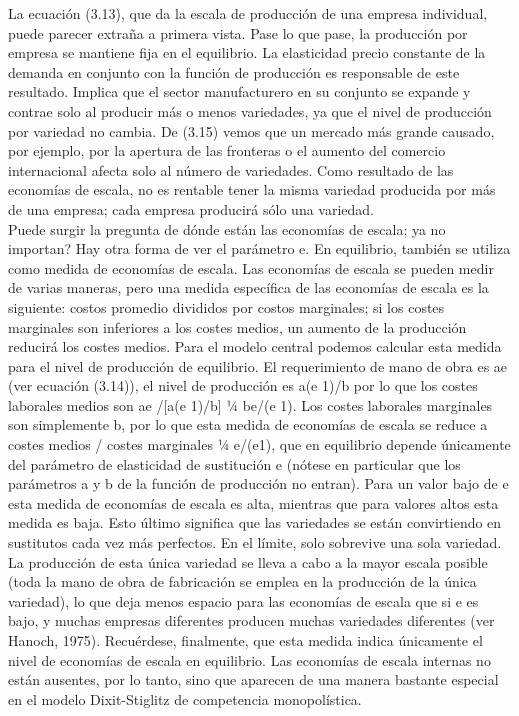 La ecuación (3.13), que da la escala de producción de una empresa individual, puede parecer extraña a primera vista. Pase lo que pase, la producción por empresa se mantiene fija en el equilibrio. La elasticidad precio constante de la demanda en conjunto con la función de producción es responsable de este resultado. Implica que el sector manufacturero en su conjunto se expande y contrae solo al producir más o menos variedades, ya que el nivel de producción por variedad no cambia. De (3.15) vemos que un mercado más grande causado, por ejemplo, por la apertura de las fronteras o el aumento del comercio internacional afecta solo al número de variedades. Como resultado de las economías de escala, no es rentable tener la misma variedad producida por más de una empresa; cada empresa producirá sólo una variedad.\\
Puede surgir la pregunta de dónde están las economías de escala; ya no importan? Hay otra forma de ver el parámetro e. En equilibrio, también se utiliza como medida de economías de escala. Las economías de escala se pueden medir de varias maneras, pero una medida específica de las economías de escala es la siguiente: costos promedio divididos por costos marginales; si los costes marginales son inferiores a los costes medios, un aumento de la producción reducirá los costes medios. Para el modelo central podemos calcular esta medida para el nivel de producción de equilibrio. El requerimiento de mano de obra es ae (ver ecuación (3.14)), el nivel de producción es a(e 1)/b por lo que los costes laborales medios son ae /[a(e 1)/b] ¼ be/(e 1). Los costes laborales marginales son simplemente b, por lo que esta medida de economías de escala se reduce a costes medios / costes marginales ¼ e/(e1), que en equilibrio depende únicamente del parámetro de elasticidad de sustitución e (nótese en particular que los parámetros a y b de la función de producción no entran). Para un valor bajo de e esta medida de economías de escala es alta, mientras que para valores altos esta medida es baja. Esto último significa que las variedades se están convirtiendo en sustitutos cada vez más perfectos. En el límite, solo sobrevive una sola variedad. La producción de esta única variedad se lleva a cabo a la mayor escala posible (toda la mano de obra de fabricación se emplea en la producción de la única variedad), lo que deja menos espacio para las economías de escala que si e es bajo, y muchas empresas diferentes producen muchas variedades diferentes (ver Hanoch, 1975). Recuérdese, finalmente, que esta medida indica únicamente el nivel de economías de escala en equilibrio. Las economías de escala internas no están ausentes, por lo tanto, sino que aparecen de una manera bastante especial en el modelo Dixit-Stiglitz de competencia monopolística.

